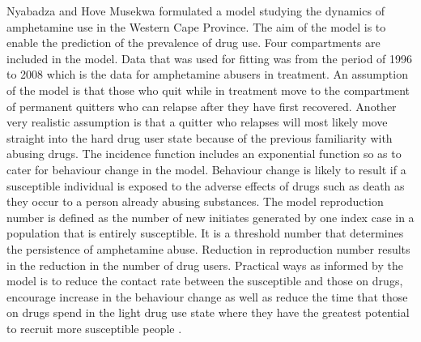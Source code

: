 Nyabadza and Hove Musekwa formulated a model studying the dynamics of amphetamine use in the Western Cape Province. The aim of the model is to enable the prediction of the prevalence of drug use. Four compartments are included in the model. Data that was used for fitting was from the period of 1996 to 2008 which is the data for amphetamine abusers in treatment. An assumption of the model is that those who quit while in treatment move to the compartment of permanent quitters who can relapse after they have first recovered. Another very realistic assumption is that a quitter who relapses will most likely move straight into the hard drug user state because of the previous familiarity with abusing drugs. The incidence function includes an exponential function so as to cater for behaviour change in the model. Behaviour change is likely to result if a susceptible individual is exposed to the adverse effects of drugs such as death as they occur to a person already abusing substances. The model reproduction number is defined as the number of new initiates generated by one index case in a population that is entirely susceptible. It is a threshold number that determines the persistence of amphetamine abuse.
Reduction in reproduction number results in the reduction in the number of drug users. Practical ways as informed by the model is to reduce the contact rate between the susceptible and those on drugs, encourage increase in the behaviour change as well as reduce the time that those on drugs spend in the light drug use state where they have the greatest potential to recruit more susceptible people \cite{nyabada2010}.


